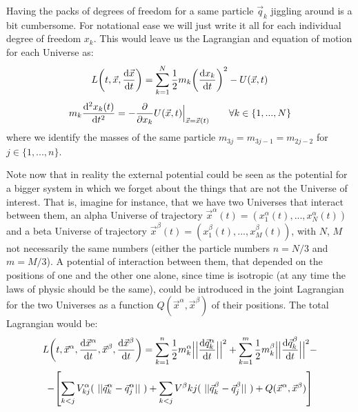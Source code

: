 \documentclass[11pt, a4paper]{article} %
\DeclareRobustCommand{\mybox}[2][gray!10]{%
\begin{tcolorbox}[   %
        left=0.2cm,
        right=0.2cm,
        top=0.15cm,
        bottom=0.15cm,
        colback=#1,
        colframe=#1,
        width=\dimexpr\textwidth\relax, 
        enlarge left by=0mm,
        boxsep=5pt,
        arc=0pt,outer arc=0pt,
        ]
        #2
\end{tcolorbox}
}
\begin{document}
Having the packs of degrees of freedom for a same particle $\vec{q}_k$ jiggling around is a bit cumbersome. For notational ease we will just write it all for each individual degree of freedom $x_k$. This would leave us the Lagrangian and equation of motion for each Universe as:
\begin{equation}\label{genLag2}
L\qty(t, \vec{x}, \dv{\vec{x}}{t})=\sum_{k=1}^N\frac{1}{2} m_k\qty(\dv{x_k}{t})^2-U(\vec{x},t)
\end{equation}
\begin{equation}
m_k \dv[2]{x_k(t)}{t} = -\pdv{}{x_k}U(\vec{x},t)\Big\rvert_{\vec{x}=\vec{x}(t)}\quad\quad \forall k\in\{1,...,N\}
\end{equation}
where we identify the masses of the same particle $m_{3j}=m_{3j-1}=m_{2j-2}$ for $j\in\{1,...,n\}$.
\mybox{
Note now that in reality the external potential could be seen as the potential for a bigger system in which we forget about the things that are not the Universe of interest. That is, imagine for instance, that we have two Universes that interact between them, an alpha Universe of trajectory $\vec{x}^\alpha(t)=(x_1^\alpha(t),...,x_N^\alpha(t))$ and a beta Universe of trajectory $\vec{x}^\beta(t)=(x_1^\beta(t),...,x_M^\beta(t))$, with $N$, $M$ not necessarily the same numbers (either the particle numbers $n=N/3$ and $m=M/3$). A potential of interaction between them, that depended on the positions of one and the other one alone, since time is isotropic (at any time the laws of physic should be the same), could be introduced in the joint Lagrangian for the two Universes as a function $Q(\vec{x}^\alpha, \vec{x}^\beta)$ of their positions. The total Lagrangian would be:
\begin{equation}
L\qty(t, \vec{x}^\alpha, \dv{\vec{x}^\alpha}{t}, \vec{x}^\beta, \dv{\vec{x}^\beta}{t})=\sum_{k=1}^n\frac{1}{2} m^\alpha_k\Big|\Big|\dv{\vec{q}^\alpha_k}{t}\Big|\Big|^2+\sum_{k=1}^m\frac{1}{2} m^\beta_k\Big|\Big|\dv{\vec{q}^\beta_k}{t}\Big|\Big|^2-
\end{equation}
$$
-\qty[\sum_{k<j} V^\alpha_{kj}(\ ||\vec{q}^\alpha_k-\vec{q}^\alpha_j||\ )+\sum_{k<j} V^\beta{kj}(\ ||\vec{q}^\beta_k-\vec{q}^\beta_j||\ )+ Q(\vec{x}^\alpha, \vec{x}^\beta)]
$$

}
\end{document}
